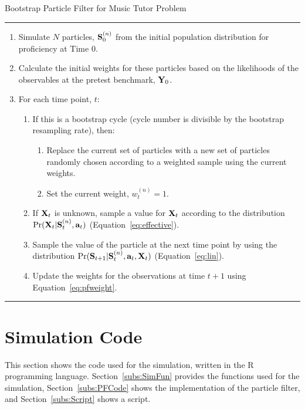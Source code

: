 \documentclass[12pt]{RR-article}
\begin{document}
\begin{table}
\caption{Bootstrap Particle Filter for Music Tutor Problem}
\label{tab:pf}
\hrule
\begin{enumerate}
\sl
\item Simulate $N$ particles, ${\bf S}^{(n)}_0$ from the initial
  population distribution for proficiency at Time 0.

\item Calculate the initial weights for these particles based on the
  likelihoods of the observables at the pretest benchmark, ${\bf
  Y}_0$.

\item For each time point, $t$:

\begin{enumerate}

\item If this is a bootstrap cycle (cycle number is divisible by
the bootstrap resampling rate), then:
\begin{enumerate}
\item Replace the current set of particles with a new set of particles
  randomly chosen according to a weighted sample using the current
  weights.
\item Set the current weight, $w^{(n)}_t=1$.
\end{enumerate}
\item If ${\bf X}_t$ is unknown, sample a value for ${\bf X}_t$
  according to the distribution $\Pr({\bf X}_t|{\bf S}^{(n)}_t, {\bf
  a}_t)$ (Equation~\ref{eq:effective}).
\item \label{st:advance} Sample the value of the particle at the next
  time point by using the distribution $\Pr({\bf S}_{t+1}|{\bf
  S}^{(n)}_t,{\bf a}_t,{\bf X}_t)$ (Equation~\ref{eq:lin}).
\item Update the weights for the observations at time $t+1$ using
  Equation~\ref{eq:pfweight}.  
\end{enumerate}
\end{enumerate}
\hrule
\end{table}




\section{Simulation Code}
\label{appx:R}

This section shows the code used for the simulation, written in the R
\cite{R} programming language.  Section~\ref{subs:SimFun} provides
the functions used for the simulation, Section~\ref{subs:PFCode} shows
the implementation of the particle filter, and
Section~\ref{subs:Script} shows a script.
\end{document}
